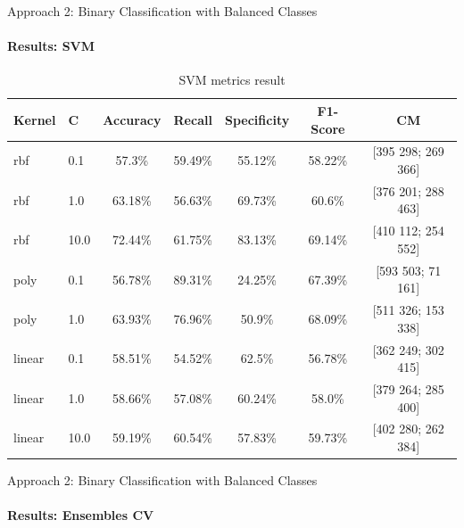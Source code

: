 \documentclass[9pt, pstricks, xcolor=dvipsnames]{beamer}
\begin{document}
\begin{frame}{Approach 2: Binary Classification
with Balanced Classes}
\framesubtitle{Results: SVM}
\begin{table}[H]
\centering
\begin{tabular}{llccccc}
\toprule
Kernel & C & Accuracy & Recall & Specificity & F1-Score & CM \\
\midrule
rbf & 0.1 & 57.3\%  & 59.49\%  & 55.12\%  & 58.22\% & [395 298; 269 366] \\
rbf & 1.0 & 63.18\%  & 56.63\%  & 69.73\%  & 60.6\% & [376 201; 288 463] \\
rbf & 10.0 & 72.44\%  & 61.75\%  & 83.13\%  & 69.14\% & [410 112; 254 552] \\
poly & 0.1 & 56.78\%  & 89.31\%  & 24.25\%  & 67.39\% & [593 503; 71 161] \\
poly & 1.0 & 63.93\%  & 76.96\%  & 50.9\%  & 68.09\% & [511 326; 153 338] \\
linear & 0.1 & 58.51\%  & 54.52\%  & 62.5\%  & 56.78\% & [362 249; 302 415] \\
linear & 1.0 & 58.66\%  & 57.08\%  & 60.24\%  & 58.0\% & [379 264; 285 400] \\
linear & 10.0 & 59.19\%  & 60.54\%  & 57.83\%  & 59.73\% & [402 280; 262 384] \\
\bottomrule
\end{tabular}
\caption{SVM metrics result}
\label{tab:SVM_approach2}
\end{table}
\end{frame}
\begin{frame}{Approach 2: Binary Classification
with Balanced Classes}
\framesubtitle{Results: Ensembles CV}
\begin{table}[H]
    \centering
    \caption{Ensemble Model metrics result for CrossValidation}
    \label{tab:EM_CV_approach2}
\end{table}
\end{frame}
\end{document}
